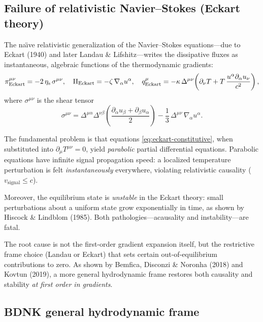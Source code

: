 \subsection{Failure of relativistic Navier--Stokes (Eckart theory)}
\label{sec:eckart-failure}

The na\"{\i}ve relativistic generalization of the Navier--Stokes
equations---due to Eckart (1940) and later Landau \&
Lifshitz---writes the dissipative fluxes as instantaneous,
algebraic functions of the thermodynamic gradients:
\begin{equation}
  \pi^{\mu\nu}_{\mathrm{Eckart}}
    = -2\,\eta_{\mathrm{s}}\,\sigma^{\mu\nu},
  \quad
  \Pi_{\mathrm{Eckart}} = -\zeta\,\nabla_{\alpha} u^{\alpha},
  \quad
  q^{\mu}_{\mathrm{Eckart}}
    = -\kappa\,\Delta^{\mu\nu}\!\left(\partial_{\nu} T
      + T\,\frac{u^{\alpha}\partial_{\alpha} u_{\nu}}{c^2}\right),
  \label{eq:eckart-constitutive}
\end{equation}
where $\sigma^{\mu\nu}$ is the shear tensor
\begin{equation}
  \sigma^{\mu\nu} = \Delta^{\mu\alpha}\Delta^{\nu\beta}
    \!\left(\frac{\partial_{\alpha} u_{\beta}
      + \partial_{\beta} u_{\alpha}}{2}\right)
    - \frac{1}{3}\,\Delta^{\mu\nu}\,\nabla_{\alpha} u^{\alpha}.
  \label{eq:shear-tensor}
\end{equation}

The fundamental problem is that equations
\eqref{eq:eckart-constitutive}, when substituted into
$\partial_{\mu}T^{\mu\nu} = 0$, yield \emph{parabolic} partial
differential equations.  Parabolic equations have infinite signal
propagation speed: a localized temperature perturbation is felt
\emph{instantaneously} everywhere, violating relativistic causality
($v_{\mathrm{signal}} \le c$).

Moreover, the equilibrium state is \emph{unstable} in the
Eckart theory: small perturbations about a uniform state grow
exponentially in time, as shown by Hiscock \& Lindblom (1985).
Both pathologies---acausality and instability---are fatal.

The root cause is not the first-order gradient expansion itself,
but the restrictive frame choice (Landau or Eckart) that sets
certain out-of-equilibrium contributions to zero.  As shown by
Bemfica, Disconzi \& Noronha (2018) and Kovtun (2019), a more
general hydrodynamic frame restores both causality and stability
\emph{at first order in gradients}.

\subsection{BDNK general hydrodynamic frame}
\label{sec:bdnk-frame}

